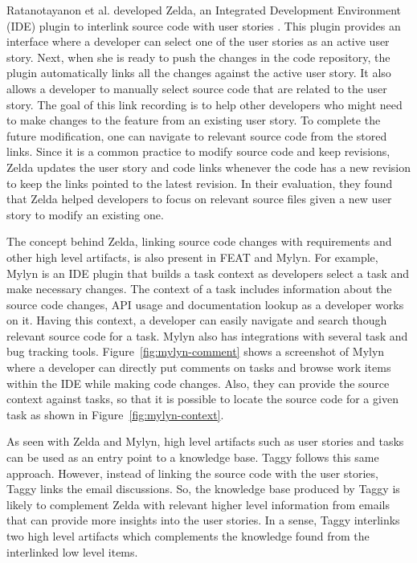 Ratanotayanon et al. developed Zelda, an Integrated Development Environment (IDE) plugin to interlink source code with user stories \cite{supporting_program}. This plugin provides an interface where a developer can select one of the user stories as an active user story. Next, when she is ready to push the changes in the code repository, the plugin automatically links all the changes against the active user story. It also allows a developer to manually select source code that are related to the user story. The goal of this link recording is to help other developers who might need to make changes to the feature from an existing user story. To complete the future modification, one can navigate to relevant source code from the stored links. Since it is a common practice to modify source code and keep revisions, Zelda updates the user story and code links whenever the code has a new revision to keep the links pointed to the latest revision. In their evaluation, they found that Zelda helped developers to focus on relevant source files given a new user story to modify an existing one.

The concept behind Zelda, linking source code changes with requirements and other high level artifacts, is also present in FEAT\cite{feat} and Mylyn\cite{mylyn}. For example, Mylyn is an IDE plugin that builds a task context as developers select a task and make necessary changes. The context of a task includes information about the source code changes, API usage and documentation lookup as a developer works on it. Having this context, a developer can easily navigate and search though relevant source code for a task. Mylyn also has integrations with several task and bug tracking tools. Figure~\ref{fig:mylyn-comment} shows a screenshot of Mylyn where a developer can directly put comments on tasks and browse work items within the IDE while making code changes. Also, they can provide the source context against tasks, so that it is possible to locate the source code for a given task as shown in Figure~\ref{fig:mylyn-context}.

As seen with Zelda and Mylyn, high level artifacts such as user stories and tasks can be used as an entry point to a knowledge base. Taggy follows this same approach. However, instead of linking the source code with the user stories, Taggy links the email discussions. So, the knowledge base produced by Taggy is likely to complement Zelda with relevant higher level information from emails that can provide more insights into the user stories. In a sense, Taggy interlinks two high level artifacts which complements the knowledge found from the interlinked low level items.

